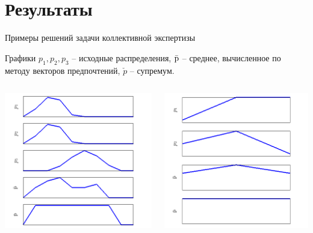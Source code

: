  
\section{Результаты}
\begin{frame}{Примеры решений задачи  коллективной экспертизы}
  \vspace{-2ex}
  \begin{center}
    Графики $p_1, p_2, p_3$ -- исходные распределения, $\bar{{\mathrm{p}}}$ -- среднее, вычисленное по методу векторов предпочтений, $\check{p}$ -- супремум. 
  \end{center} 
  \vspace{-3ex}
  \begin{columns}
	  \begin{center}
	      \includegraphics[width=0.9\linewidth]{./pic/prefsup102}
	  \end{center}
          \begin{center}
	      \includegraphics[width=1\linewidth]{./pic/prefsup6}

\end{center}
\end{columns}
\end{frame}
